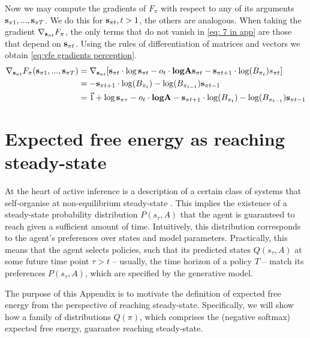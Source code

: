 \documentclass[review,12pt,authoryear]{elsarticle}
\begin{document}
Now we may compute the gradients of $F_\pi$ with respect to any of its arguments $\bold s_{\pi 1},...,\bold s_{\pi T}$. We do this for $\bold s_{\pi t}, t>1$, the others are analogous. When taking the gradient $\nabla _{\bold s_{\pi t}} F_\pi$, the only terms that do not vanish in \eqref{eq: 7 in app} are those that depend on $\bold s_{\pi t}$. Using the rules of differentiation of matrices and vectors \citep{petersenMatrixCookbook2012} we obtain \eqref{eq:vfe gradients perception}.
 \begin{equation}
  	    \begin{split}
        \nabla _{\bold s_{\pi t}} F_\pi(\bold s_{\pi 1},...,\bold s_{\pi T}) &= \nabla _{\bold s_{\pi t}}[ \bold s_{\pi t } \cdot \log \bold s_{\pi t } 
        -  o_t \cdot \textbf{log} \bold A \bold s_{\pi t }-\bold s_{\pi t+1} \cdot \log (B_{\pi_{ t}})s_{\pi t}] \\
        &= -\bold s_{\pi t+1} \cdot \log (B_{\pi_{ t}}) -\log (B_{\pi_{ t-1}}) \bold s_{\pi t-1} \\
        &=\vec {1} +\log  \bold s_{\pi\tau} - o_t \cdot \textbf{log} \bold A-\bold s_{\pi t+1} \cdot \log (B_{\pi_{ t}}) -\log (B_{\pi_{ t-1}}) \bold s_{\pi t-1}
    \end{split}
\end{equation}


\section{Expected free energy as reaching steady-state}
\label{Appendix:steady-state lemma}

At the heart of active inference is a description of a certain class of systems that self-organise at non-equilibrium steady-state \citep{parrMarkovBlanketsInformation2020,fristonFreeEnergyPrinciple2019}. This implies the existence of a steady-state probability distribution $P(s_\tau,A)$ that the agent is guaranteed to reach given a sufficient amount of time. Intuitively, this distribution corresponds to the agent's preferences over states and model parameters. Practically, this means that the agent selects policies, such that its predicted states $Q(s_\tau,A)$ at some future time point $\tau >t$ -- usually, the time horizon of a policy $T$ -- match its preferences $P(s_\tau,A)$, which are specified by the generative model.

The purpose of this Appendix is to motivate the definition of expected free energy from the perspective of reaching steady-state. Specifically, we will show how a family of distributions $Q(\pi)$, which comprises the (negative softmax) expected free energy, guarantee reaching steady-state.
\end{document}
